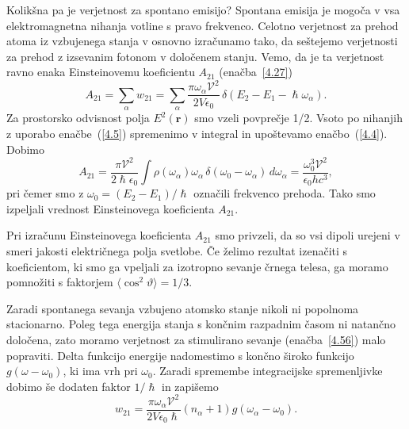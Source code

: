 Kolikšna pa je verjetnost za spontano emisijo?
Spontana emisija je mogoča v vsa elektromagnetna nihanja votline s
pravo frekvenco. Celotno verjetnost za prehod atoma iz vzbujenega stanja
v osnovno izračunamo tako, da seštejemo verjetnosti za prehod z izsevanim fotonom 
v določenem stanju. Vemo, da je ta verjetnost ravno enaka 
Einsteinovemu koeficientu $A_{21}$ (enačba~\ref{4.27})
\begin{equation}
A_{21}=\sum_{\alpha}w_{21}=\sum_{\alpha}\frac{\pi \omega_{\alpha}\mathcal{V}^{2}}
{2V\epsilon_{0}}\,\delta(E_{2}-E_{1}-\hslash\omega_{\alpha}).
\label{4.57}
\end{equation}
Za prostorsko odvisnost polja $E^{2}(\mathbf{r})$ smo vzeli povprečje
1/2. Vsoto po nihanjih z uporabo enačbe~(\ref{4.5}) spremenimo v integral
in upoštevamo enačbo~(\ref{4.4}). Dobimo
\begin{equation}
A_{21}=\frac{\pi \mathcal{V}^{2}}{2\hslash\epsilon_{0}}\int\rho(\omega_{\alpha})\omega_\alpha\, 
\delta(\omega_{0}-\omega_{\alpha})\, d\omega_{\alpha}=\frac{\omega_{0}^{3}\mathcal{V}^{2}}{\epsilon_{0} h c^{3}},
\label{4.58}
\end{equation}
 pri čemer smo z $\omega_{0}=(E_{2}-E_{1})/\hslash$ označili frekvenco prehoda. Tako smo 
 izpeljali vrednost Einsteinovega koeficienta $A_{21}$. 
\begin{remark}
Pri izračunu Einsteinovega koeficienta $A_{21}$ smo privzeli, da so vsi dipoli urejeni  
 v smeri jakosti električnega polja svetlobe. Če želimo rezultat izenačiti s koeficientom, ki smo ga vpeljali
 za izotropno sevanje črnega telesa, ga moramo pomnožiti s faktorjem $\langle \cos^2\vartheta
 \rangle = 1/3$.
\end{remark}

Zaradi spontanega sevanja vzbujeno atomsko stanje nikoli ni popolnoma
stacionarno. Poleg tega energija stanja s končnim razpadnim časom ni natančno
določena, zato moramo verjetnost za stimulirano sevanje (enačba~\ref{4.56}) malo 
popraviti. Delta funkcijo energije nadomestimo s končno široko  
funkcijo $g(\omega-\omega_0)$, ki ima vrh pri $\omega_{0}$. Zaradi 
spremembe integracijske spremenljivke dobimo še dodaten faktor $1/\hslash$ in zapišemo
\begin{equation}
w_{21}=\frac{\pi \omega_{\alpha}\mathcal{V}^{2}}{2V\epsilon_{0}\hslash}
(n_{\alpha}+1)g(\omega_{\alpha}-\omega_0).
\label{4.59}
\end{equation}

